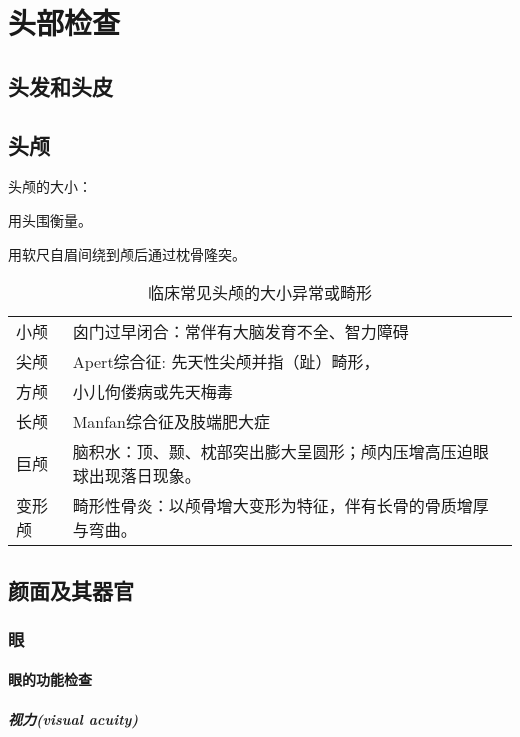 \documentclass[UTF8]{ctexbook}
\begin{document}
\chapter{头部检查}
\section{头发和头皮}
\section{头颅}
头颅的大小：

用头围衡量。

用软尺自眉间绕到颅后通过枕骨隆突。

\begin{table}[htbp]
    \centering
    \caption{临床常见头颅的大小异常或畸形}  \label{t}
    \begin{tabular}{ll}
        \hline
        小颅   & 囟门过早闭合：常伴有大脑发育不全、智力障碍                           \\
        尖颅   & Apert综合征: 先天性尖颅并指（趾）畸形，                              \\
        方颅   & 小儿佝偻病或先天梅毒                                                 \\
        长颅   & Manfan综合征及肢端肥大症                                             \\
        巨颅   & 脑积水：顶、颞、枕部突出膨大呈圆形；颅内压增高压迫眼球出现落日现象。 \\
        变形颅 & 畸形性骨炎：以颅骨增大变形为特征，伴有长骨的骨质增厚与弯曲。         \\
        \hline
    \end{tabular}%
    
\end{table}%


\section{颜面及其器官}
\subsection{眼}
\subsubsection{眼的功能检查}

\paragraph{视力(visual acuity)}
\end{document}

